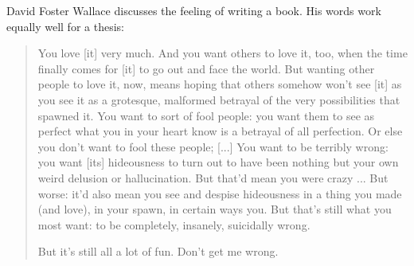 David Foster Wallace discusses the feeling of writing a book.
His words work equally well for a thesis:

\begin{quotation}
You love [it] very much. And you want others to love it, too, when the time
finally comes for [it] to go out and face the world. But wanting other people
to love it, now, means hoping that others somehow won't see [it] as you see it
\dash as a grotesque, malformed betrayal of the very possibilities that
spawned it. You want to sort of fool people: you want them to see as perfect
what you in your heart know is a betrayal of all perfection. Or else you don't
want to fool these people; [...] You want to be terribly wrong: you want [its]
hideousness to turn out to have been nothing but your own weird delusion or
hallucination. But that'd mean you were crazy ... But worse: it'd also mean
you see and despise hideousness in a thing you made (and love), in your spawn,
in certain ways you. But that's still what you most want: to be completely,
insanely, suicidally wrong.

But it's still all a lot of fun. Don't get me wrong.
\end{quotation}
